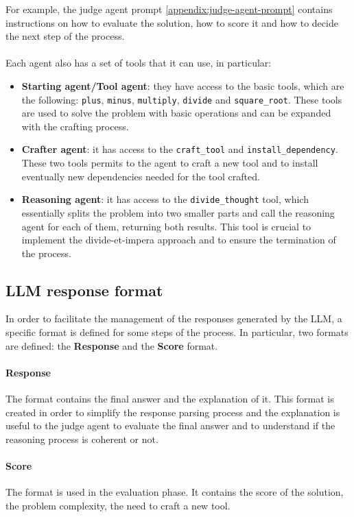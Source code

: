 \documentclass[12pt,a4paper,openright,twoside]{book}
\begin{document}
For example, the judge agent prompt \cref{appendix:judge-agent-prompt} contains instructions on how to evaluate the solution, how to score it and how to decide the next step of the process.
\\\\
Each agent also has a set of tools that it can use, in particular:
\begin{itemize}
    \item \textbf{Starting agent/Tool agent}: they have access to the basic tools, which are the following: \texttt{plus}, \texttt{minus}, \texttt{multiply}, \texttt{divide} and \texttt{square\_root}. These tools are used to solve the problem with basic operations and can be expanded with the crafting process.
    \item \textbf{Crafter agent}: it has access to the \texttt{craft\_tool} and \texttt{install\_dependency}. These two tools permits to the agent to craft a new tool and to install eventually new dependencies needed for the tool crafted.
    \item \textbf{Reasoning agent}: it has access to the \texttt{divide\_thought} tool, which essentially splits the problem into two smaller parts and call the reasoning agent for each of them, returning both results. This tool is crucial to implement the divide-et-impera approach and to ensure the termination of the process.
\end{itemize}

\subsection{LLM response format}
In order to facilitate the management of the responses generated by the LLM, a specific format is defined for some steps of the process. In particular, two formats are defined: the \textbf{Response} and the \textbf{Score} format.

\paragraph{Response}
The format contains the final answer and the explanation of it. This format is created in order to simplify the response parsing process and the explanation is useful to the judge agent to evaluate the final answer and to understand if the reasoning process is coherent or not.
\paragraph{Score}
The format is used in the evaluation phase. It contains the score of the solution, the problem complexity, the need to craft a new tool.
\end{document}
